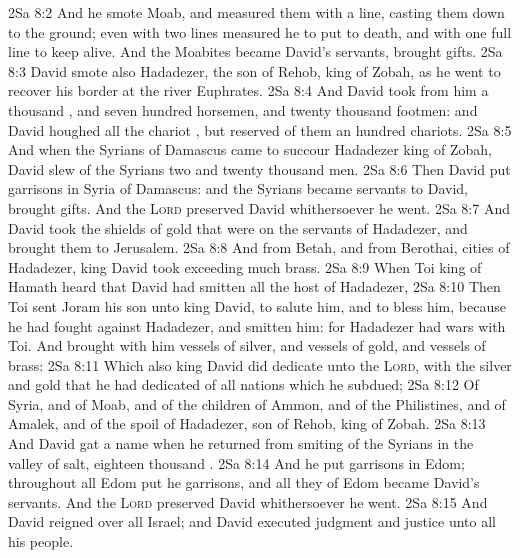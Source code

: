 \vs 2Sa 8:2 And he smote Moab, and measured them with a line, casting them down to the ground; even with two lines measured he to put to death, and with one full line to keep alive. And  the Moabites became David's servants,  brought gifts.
\vs 2Sa 8:3 David smote also Hadadezer, the son of Rehob, king of Zobah, as he went to recover his border at the river Euphrates.
\vs 2Sa 8:4 And David took from him a thousand , and seven hundred horsemen, and twenty thousand footmen: and David houghed all the chariot , but reserved of them  an hundred chariots.
\vs 2Sa 8:5 And when the Syrians of Damascus came to succour Hadadezer king of Zobah, David slew of the Syrians two and twenty thousand men.
\vs 2Sa 8:6 Then David put garrisons in Syria of Damascus: and the Syrians became servants to David,  brought gifts. And the \textsc{Lord} preserved David whithersoever he went.
\vs 2Sa 8:7 And David took the shields of gold that were on the servants of Hadadezer, and brought them to Jerusalem.
\vs 2Sa 8:8 And from Betah, and from Berothai, cities of Hadadezer, king David took exceeding much brass.
\vs 2Sa 8:9 When Toi king of Hamath heard that David had smitten all the host of Hadadezer,
\vs 2Sa 8:10 Then Toi sent Joram his son unto king David, to salute him, and to bless him, because he had fought against Hadadezer, and smitten him: for Hadadezer had wars with Toi. And  brought with him vessels of silver, and vessels of gold, and vessels of brass:
\vs 2Sa 8:11 Which also king David did dedicate unto the \textsc{Lord}, with the silver and gold that he had dedicated of all nations which he subdued;
\vs 2Sa 8:12 Of Syria, and of Moab, and of the children of Ammon, and of the Philistines, and of Amalek, and of the spoil of Hadadezer, son of Rehob, king of Zobah.
\vs 2Sa 8:13 And David gat  a name when he returned from smiting of the Syrians in the valley of salt,  eighteen thousand .
\vs 2Sa 8:14 And he put garrisons in Edom; throughout all Edom put he garrisons, and all they of Edom became David's servants. And the \textsc{Lord} preserved David whithersoever he went.
\vs 2Sa 8:15 And David reigned over all Israel; and David executed judgment and justice unto all his people.
